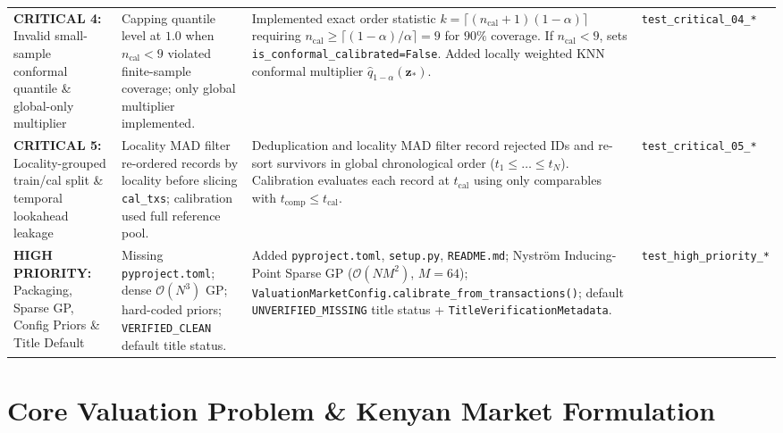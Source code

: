 \documentclass[11pt,a4paper]{article}
\begin{document}
\begin{table}[!htbp]
{\begin{tabular}{p{3.4cm} p{4.8cm} p{6.2cm} l}
\addlinespace[4pt]
\textbf{CRITICAL 4:} Invalid small-sample conformal quantile \& global-only multiplier & Capping quantile level at $1.0$ when $n_{\text{cal}} < 9$ violated finite-sample coverage; only global multiplier implemented. & Implemented exact order statistic $k = \lceil (n_{\text{cal}}+1)(1-\alpha) \rceil$ requiring $n_{\text{cal}} \ge \lceil (1-\alpha)/\alpha \rceil = 9$ for $90\%$ coverage. If $n_{\text{cal}} < 9$, sets \texttt{is\_conformal\_calibrated=False}. Added locally weighted KNN conformal multiplier $\hat{q}_{1-\alpha}(\mathbf{z}_*)$. & \texttt{test\_critical\_04\_*} \\
\addlinespace[4pt]
\textbf{CRITICAL 5:} Locality-grouped train/cal split \& temporal lookahead leakage & Locality MAD filter re-ordered records by locality before slicing \texttt{cal\_txs}; calibration used full reference pool. & Deduplication and locality MAD filter record rejected IDs and re-sort survivors in global chronological order ($t_1 \le \dots \le t_N$). Calibration evaluates each record at $t_{\text{cal}}$ using only comparables with $t_{\text{comp}} \le t_{\text{cal}}$. & \texttt{test\_critical\_05\_*} \\
\addlinespace[4pt]
\textbf{HIGH PRIORITY:} Packaging, Sparse GP, Config Priors \& Title Default & Missing \texttt{pyproject.toml}; dense $\mathcal{O}(N^3)$ GP; hard-coded priors; \texttt{VERIFIED\_CLEAN} default title status. & Added \texttt{pyproject.toml}, \texttt{setup.py}, \texttt{README.md}; Nystr\"om Inducing-Point Sparse GP ($\mathcal{O}(NM^2)$, $M=64$); \texttt{ValuationMarketConfig.calibrate\_from\_transactions()}; default \texttt{UNVERIFIED\_MISSING} title status + \texttt{TitleVerificationMetadata}. & \texttt{test\_high\_priority\_*} \\
\bottomrule
\end{tabular}%
}
\end{table}

\section{Core Valuation Problem \& Kenyan Market Formulation}
\end{document}
